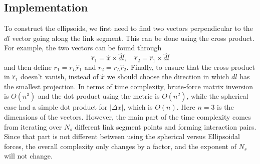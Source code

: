 \documentclass[nofootinbib,preprint,floatfix,titlepage,superscriptaddress]{revtex4} %
\begin{document}
\subsection{Implementation}
To construct the ellipsoids, we first need to find two vectors perpendicular to the $dl$ vector going along the link segment. This can be done using the cross product.
For example, the two vectors can be found through 
\begin{equation}
    \hat{r}_1 = \hat{x} \times \hat{dl}, \quad \hat{r}_2 = \hat{r}_1 \times \hat{dl} 
    \label{eq:r12}
\end{equation}
and then define $r_1 = r_L \hat{r}_1$ and $r_2 = r_L \hat{r}_2$. Finally, to ensure that the cross product in $\hat{r}_1$ doesn't vanish, instead of $\hat{x}$ we should choose the direction in which $dl$ has the smallest projection. 
In terms of time complexity, brute-force matrix inversion is $O(n^3)$ and the dot product using the metric is $O(n^2)$, while the spherical case had a simple dot product for $|\Delta x|$, which is $O(n)$. Here $n=3$ is the dimensions of the vectors. 
However, the main part of the time complexity comes from iterating over $N_s$ different link segment points and forming interaction pairs. 
Since that part is not different between using the spherical versus Ellipsoidal forces, the overall complexity only changes by a factor, and the exponent of $N_s$ will not change.
\end{document}
